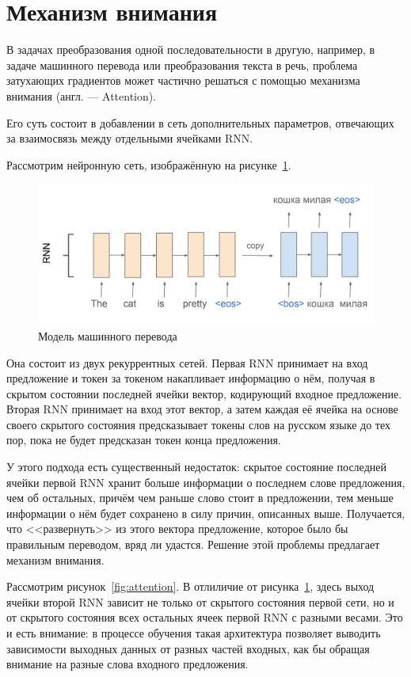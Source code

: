 \section{Механизм внимания}

В задачах преобразования одной последовательности в другую, например, в задаче машинного перевода или преобразования текста в речь, проблема затухающих градиентов может частично решаться с помощью механизма внимания (англ. --- Attention).

Его суть состоит в добавлении в сеть дополнительных параметров, отвечающих за взаимосвязь между отдельными ячейками RNN.

Рассмотрим нейронную сеть, изображённую на рисунке \ref*{fig:seq2seq}.

\begin{figure}[h]
    \centering
    \includegraphics[width=\textwidth]{../inc/images/seq2seq.png}
    \caption{Модель машинного перевода}
    \label{fig:seq2seq}
\end{figure}

Она состоит из двух рекуррентных сетей. Первая RNN принимает на вход предложение и токен за токеном накапливает информацию о нём, получая в скрытом состоянии последней ячейки вектор, кодирующий входное предложение. Вторая RNN принимает на вход этот вектор, а затем каждая её ячейка на основе своего скрытого состояния предсказывает токены слов на русском языке до тех пор, пока не будет предсказан токен конца предложения.

У этого подхода есть существенный недостаток: скрытое состояние последней ячейки первой RNN хранит больше информации о последнем слове предложения, чем об остальных, причём чем раньше слово стоит в предложении, тем меньше информации о нём будет сохранено в силу причин, описанных выше. Получается, что <<развернуть>> из этого вектора предложение, которое было бы правильным переводом, вряд ли удастся. Решение этой проблемы предлагает механизм внимания.

Рассмотрим рисунок \ref*{fig:attention}. В отлиличие от рисунка \ref*{fig:seq2seq}, здесь выход ячейки второй RNN зависит не только от скрытого состояния первой сети, но и от скрытого состояния всех остальных ячеек первой RNN с разными весами. Это и есть внимание: в процессе обучения такая архитектура позволяет выводить зависимости выходных данных от разных частей входных, как бы обращая внимание на разные слова входного предложения.


